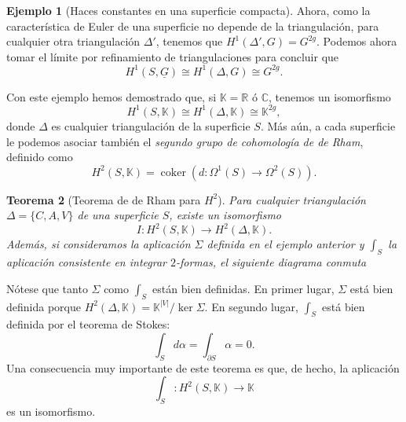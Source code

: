 \documentclass[12pt,a4paper]{article}
\newtheorem{thm}{Teorema}[section]
\theoremstyle{definition} \newtheorem{defn}[thm]{Definición}
\theoremstyle{definition} \newtheorem{ejemplo}[thm]{Ejemplo}
\theoremstyle{definition} \newtheorem{ejercicio}[thm]{Ejercicio}
\DeclareMathOperator{\coker}{coker}
\begin{document}
\begin{ejemplo}[Haces constantes en una superficie compacta]
    Ahora, como la característica de Euler de una superficie no depende de la triangulación, para cualquier otra triangulación $\Delta'$, tenemos que $H^1(\Delta',G)=G^{2g}$. Podemos ahora tomar el límite por refinamiento de triangulaciones para concluir que
    \begin{equation*}
      H^1(S,\underline{G}) \cong H^1(\Delta,G) \cong G^{2g}.
    \end{equation*}
\end{ejemplo}

    Con este ejemplo hemos demostrado que, si $\mathbb{K}=\mathbb{R}$ ó $\mathbb{C}$, tenemos un isomorfismo
    \begin{equation*}
      H^1(S,\mathbb{K}) \cong H^1(\Delta,\mathbb{K}) \cong \mathbb{K}^{2g},
    \end{equation*}
    donde $\Delta$ es cualquier triangulación de la superficie $S$.
    Más aún, a cada superficie le podemos asociar también el \emph{segundo grupo de cohomología de de Rham}, definido como
    $$H^2(S,\mathbb{K}) = \coker(d: \Omega^1(S) \rightarrow \Omega^2(S)). $$

    \begin{thm}[Teorema de de Rham para $H^2$]
      Para cualquier triangulación $\Delta=\{C,A,V\}$ de una superficie $S$, existe un isomorfismo $$I:H^2(S,\mathbb{K}) \longrightarrow H^2(\Delta,\mathbb{K}).$$ Además, si consideramos la aplicación $\Sigma$ definida en el ejemplo anterior y $\int_S$ la aplicación consistente en integrar $2$-formas, el siguiente diagrama conmuta
      \begin{center}
       \end{center}
    \end{thm}

    Nótese que tanto $\Sigma$ como $\int_S$ están bien definidas. En primer lugar, $\Sigma$ está bien definida porque $H^2(\Delta,\mathbb{K}) = \mathbb{K}^{|V|} / \ker \Sigma$. En segundo lugar, $\int_S$ está bien definida por el teorema de Stokes:
    \begin{equation*}
      \int_S d \alpha = \int_{\partial S} \alpha = 0.
    \end{equation*}
    Una consecuencia muy importante de este teorema es que, de hecho, la aplicación
    \begin{equation*}
      \int_S: H^2(S,\mathbb{K}) \longrightarrow \mathbb{K}
    \end{equation*}
    es un isomorfismo.
\end{document}

